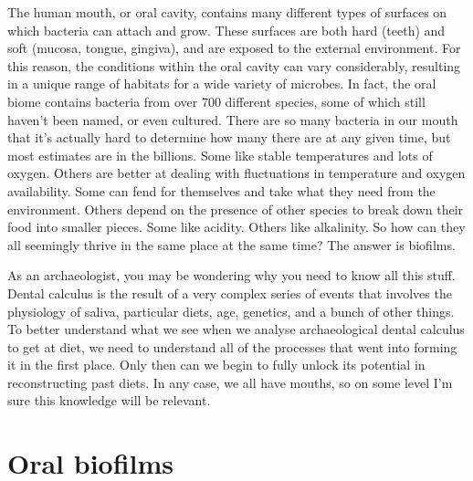 \documentclass[
  b5paper,
]{book}
\begin{document}
The human mouth, or oral cavity, contains many different types of
surfaces on which bacteria can attach and grow. These surfaces are both
hard (teeth) and soft (mucosa, tongue, gingiva), and are exposed to the
external environment. For this reason, the conditions within the oral
cavity can vary considerably, resulting in a unique range of habitats
for a wide variety of microbes. In fact, the oral biome contains
bacteria from over 700 different species, some of which still haven't
been named, or even cultured. There are so many bacteria in our mouth
that it's actually hard to determine how many there are at any given
time, but most estimates are in the billions. Some like stable
temperatures and lots of oxygen. Others are better at dealing with
fluctuations in temperature and oxygen availability. Some can fend for
themselves and take what they need from the environment. Others depend
on the presence of other species to break down their food into smaller
pieces. Some like acidity. Others like alkalinity. So how can they all
seemingly thrive in the same place at the same time? The answer is
biofilms.

As an archaeologist, you may be wondering why you need to know all this
stuff. Dental calculus is the result of a very complex series of events
that involves the physiology of saliva, particular diets, age, genetics,
and a bunch of other things. To better understand what we see when we
analyse archaeological dental calculus to get at diet, we need to
understand all of the processes that went into forming it in the first
place. Only then can we begin to fully unlock its potential in
reconstructing past diets. In any case, we all have mouths, so on some
level I'm sure this knowledge will be relevant.

\section{Oral biofilms}\label{background-biofilms}
\end{document}
